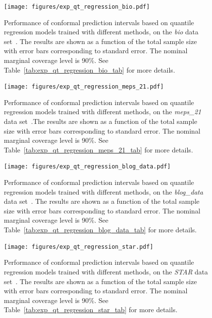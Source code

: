 \begin{figure}[!htb]
    \centering
    \texttt{[image: figures/exp\_qt\_regression\_bio.pdf]}
    \caption{Performance of conformal prediction intervals based on quantile regression models trained with different methods, on the {\em bio} data set~\cite{data-bio}. The results are shown as a function of the total sample size with error bars corresponding to standard error. The nominal marginal coverage level is 90\%. See Table~\ref{tab:exp_qt_regression_bio_tab} for more details.}
    \label{fig:exp_qt_regression_bio}
\end{figure}

\begin{figure}[!htb]
    \centering
    \texttt{[image: figures/exp\_qt\_regression\_meps\_21.pdf]}
    \caption{Performance of conformal prediction intervals based on quantile regression models trained with different methods, on the {\em meps\_21} data set~\cite{meps_21}.The results are shown as a function of the total sample size with error bars corresponding to standard error. The nominal marginal coverage level is 90\%. See Table~\ref{tab:exp_qt_regression_meps_21_tab} for more details.}
    \label{fig:exp_qt_regression_meps_21}
\end{figure}

\begin{figure}[!htb]
    \centering
    \texttt{[image: figures/exp\_qt\_regression\_blog\_data.pdf]}
    \caption{Performance of conformal prediction intervals based on quantile regression models trained with different methods, on the {\em blog\_data} data set~\cite{blog_data}. The results are shown as a function of the total sample size with error bars corresponding to standard error. The nominal marginal coverage level is 90\%. See Table~\ref{tab:exp_qt_regression_blog_data_tab} for more details.}
    \label{fig:exp_qt_regression_blog_data}
\end{figure}

\begin{figure}[!htb]
    \centering
    \texttt{[image: figures/exp\_qt\_regression\_star.pdf]}
    \caption{Performance of conformal prediction intervals based on quantile regression models trained with different methods, on the {\em STAR} data set~\cite{star}. The results are shown as a function of the total sample size with error bars corresponding to standard error. The nominal marginal coverage level is 90\%. See Table~\ref{tab:exp_qt_regression_star_tab} for more details.}
    \label{fig:exp_qt_regression_star}
\end{figure}

